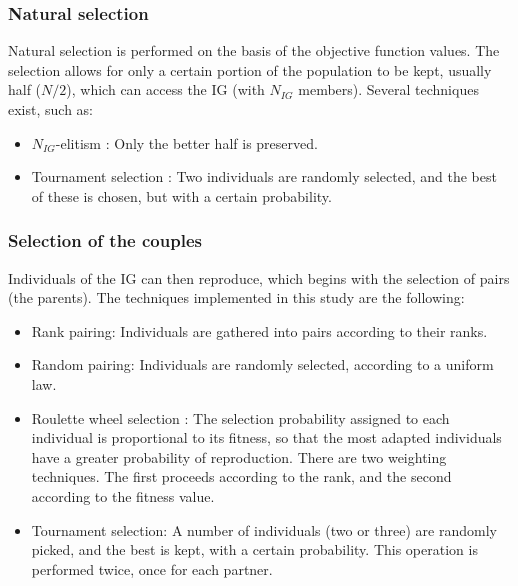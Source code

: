 \documentclass{ametsoc}
\begin{document}
\subsubsection{Natural selection}
\label{sec:gas:nat_selection}

Natural selection is performed on the basis of the objective function values. The selection allows for only a certain portion of the population to be kept, usually half ($N/2$), which can access the IG (with $N_{IG}$ members). Several techniques exist, such as:

\begin{itemize}
	\item $N_{IG}$-elitism \citep{Michalewicz1996}: Only the better half is preserved. 
	
	\item Tournament selection \citep{Michalewicz1996, Zitzler2004a}: Two individuals are randomly selected, and the best of these is chosen, but with a certain probability.
\end{itemize}


\subsubsection{Selection of the couples}
\label{sec:gas:selection_couples}

Individuals of the IG can then reproduce, which begins with the selection of pairs (the parents). The techniques implemented in this study are the following:


\begin{itemize}
	\item Rank pairing: Individuals are gathered into pairs according to their ranks.
	
	\item Random pairing: Individuals are randomly selected, according to a uniform law.
	
	\item Roulette wheel selection \citep{Goldberg1989}: The selection probability assigned to each individual is proportional to its fitness, so that the most adapted individuals have a greater probability of reproduction. There are two weighting techniques. The first proceeds according to the rank, and the second according to the fitness value.
	
	\item Tournament selection: A number of individuals (two or three) are randomly picked, and the best is kept, with a certain probability. This operation is performed twice, once for each partner.
\end{itemize}
\end{document}
